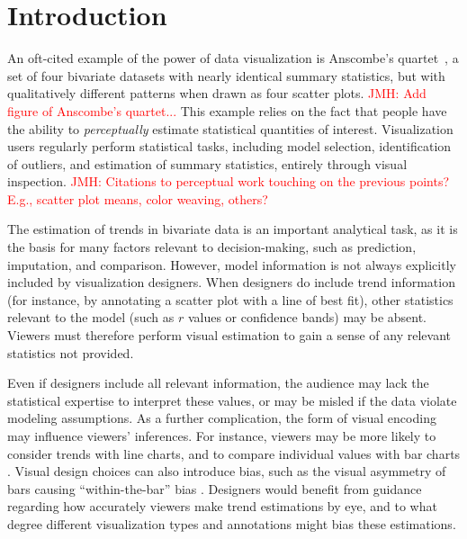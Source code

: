 \documentclass{sigchi}
\newcommand{\jeff}[1]{\textcolor{red}{JMH: #1}}
\begin{document}


\section{Introduction}


An oft-cited example of the power of data visualization is Anscombe's quartet~\cite{anscombe1973graphs}, a set of four bivariate datasets with nearly identical summary statistics, but with qualitatively different patterns when drawn as four scatter plots. \jeff{Add figure of Anscombe's quartet...} This example relies on the fact that people have the ability to \emph{perceptually} estimate statistical quantities of interest. Visualization users regularly perform statistical tasks, including model selection, identification of outliers, and estimation of summary statistics, entirely through visual inspection. \jeff{Citations to perceptual work touching on the previous points? E.g., scatter plot means, color weaving, others?}

The estimation of trends in bivariate data is an important analytical task, as it is the basis for many factors relevant to decision-making, such as prediction, imputation, and comparison. However, model information is not always explicitly included by visualization designers. When designers do include trend information (for instance, by annotating a scatter plot with a line of best fit), other statistics relevant to the model (such as $r$ values or confidence bands) may be absent. Viewers must therefore perform visual estimation to gain a sense of any relevant statistics not provided.

Even if designers include all relevant information, the audience may lack the statistical expertise to interpret these values, or may be misled if the data violate modeling assumptions. As a further complication, the form of visual encoding may influence viewers' inferences. For instance, viewers may be more likely to consider trends with line charts, and to compare individual values with bar charts \cite{zacks1999bars}. Visual design choices can also introduce bias, such as the visual asymmetry of bars causing ``within-the-bar'' bias \cite{newman2012bar}. Designers would benefit from guidance regarding how accurately viewers make trend estimations by eye, and to what degree different visualization types and annotations might bias these estimations.
\end{document}
